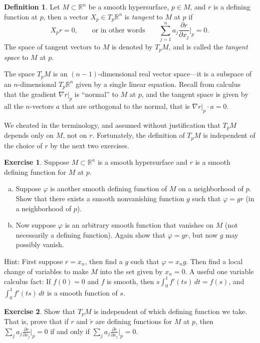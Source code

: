 \documentclass[12pt,openany]{book}
\newcommand{\R}{{\mathbb{R}}}
\newcommand{\myindex}[1]{#1\index{#1}}
\theoremstyle{plain}
\theoremstyle{remark}
\theoremstyle{definition}
\newtheorem{defn}[thm]{Definition}
\newenvironment{exbox}{%
    \def\FrameCommand{\vrule width 1pt \relax\hspace{10pt}}%
    \MakeFramed {\advance \hsize -\width \FrameRestore}%
}{%
    \endMakeFramed
}
\newenvironment{exparts}{%
    \leavevmode\begin{enumerate}[a),noitemsep,topsep=0pt,parsep=0pt,partopsep=0pt]
}{%
    \end{enumerate}
}
\theoremstyle{exercise}
\newtheorem{exercise}{Exercise}[section]
\theoremstyle{example}
\begin{document}
\begin{defn}
Let $M \subset \R^n$ be a smooth hypersurface,
$p \in M$, and $r$ is a defining function at $p$,
then a vector $X_p \in T_p \R^n$ is \emph{tangent}
to $M$ at $p$ if
\begin{equation*}
X_p r = 0, \qquad \text{or in other words} \qquad
\sum_{j=1}^n a_j \frac{\partial r}{\partial x_j} \Big|_p = 0 .
\end{equation*}
%
The space of tangent vectors to $M$ is denoted by $T_p M$, and
is called the \emph{\myindex{tangent space}} to $M$ at $p$.
\end{defn}

The space $T_pM$ is an $(n-1)$-dimensional real vector space---it is a subspace
of an $n$-dimensional $T_p\R^n$ given by a single linear equation.  
Recall from calculus that the gradient $\nabla r|_p$ is
``normal'' to $M$ at $p$, and
the tangent space is given by all the $n$-vectors $a$
that are orthogonal to the normal, that is $\nabla r|_p \cdot a = 0$.

\pagebreak[1]
We cheated in the terminology, and assumed without justification that $T_pM$
depends only on $M$, not on $r$.
Fortunately, the definition of $T_pM$ is independent of the choice of $r$ by the next two
exercises.

\begin{exbox}
\begin{exercise} \label{exercise:smoothdivision}
Suppose $M \subset \R^n$ is a smooth hypersurface and
$r$ is a smooth defining function for $M$ at $p$.
\begin{exparts}
\item
Suppose $\varphi$ is another
smooth defining function of $M$ on a neighborhood of $p$.
Show that there exists a smooth nonvanishing function $g$ such that
$\varphi = g r$ (in a neighborhood of $p$).
\item
Now suppose $\varphi$ is an arbitrary smooth function that vanishes on $M$ (not
necessarily a defining function).
Again show that $\varphi = g r$, but now $g$ may possibly vanish.
\end{exparts}
\nopagebreak
Hint: First suppose $r=x_n$, then %
find a $g$ such that $\varphi = x_n g$.  Then find
a local change of variables to make $M$ into the set given by $x_n = 0$.
A useful one variable calculus fact:
If $f(0) = 0$ and $f$ is smooth, then
$s \int_0^1 f'(ts) \,dt = f(s)$,
and $\int_0^1 f'(ts) \,dt$ is a smooth function of $s$.
\pagebreak[2]
\end{exercise}

\begin{exercise}
Show that $T_pM$ is independent of which defining function we take.  That
is,
prove that if $r$ and $\tilde{r}$ are defining functions for $M$ at $p$, then
$\sum_j a_j \frac{\partial r}{\partial x_j} \big|_p = 0$
if and only if
$\sum_j a_j \frac{\partial \tilde{r}}{\partial x_j} \big|_p = 0$.
\end{exercise}
\end{exbox}
\end{document}
